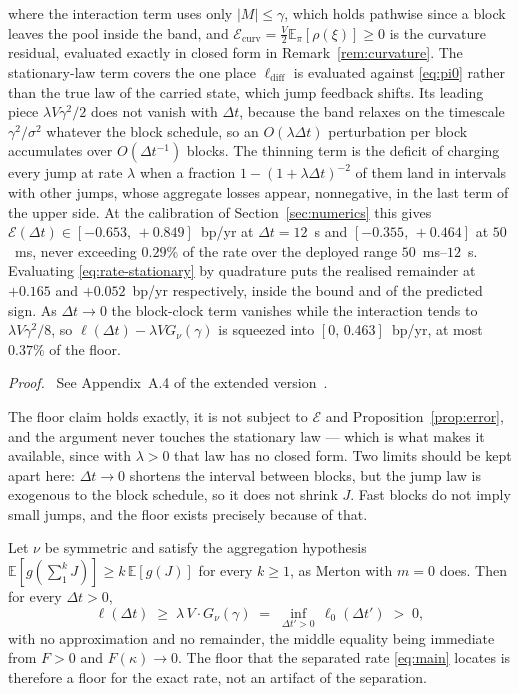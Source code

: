 \documentclass[runningheads]{llncs}
\newcommand{\E}{\mathbb{E}}
\newcommand{\dt}{\Delta t}
\newcommand{\1}{\mathbf{1}}
\newif\ifextended
\newcommand{\deferproof}[1]{%
  \par\smallskip\noindent\textit{Proof.}\ \ifextended
  See Appendix~#1.\else
  See Appendix~#1 of the extended version~\cite{bundi2026ext}.\fi\par\smallskip}
\begin{document}
\begin{proposition}
where the interaction term uses only $|M|\le\gamma$, which holds pathwise since a block leaves the pool inside the band, and $\mathcal{E}_{\mathrm{curv}} = \tfrac{V}{2}\E_\pi[\rho(\xi)] \ge 0$ is the curvature residual, evaluated exactly in closed form in Remark~\ref{rem:curvature}. The stationary-law term covers the one place $\ell_{\mathrm{diff}}$ is evaluated against \eqref{eq:pi0} rather than the true law of the carried state, which jump feedback shifts. Its leading piece $\lambda V\gamma^2/2$ does not vanish with $\dt$, because the band relaxes on the timescale $\gamma^2/\sigma^2$ whatever the block schedule, so an $O(\lambda\dt)$ perturbation per block accumulates over $O(\dt^{-1})$ blocks. The thinning term is the deficit of charging every jump at rate $\lambda$ when a fraction $1-(1+\lambda\dt)^{-2}$ of them land in intervals with other jumps, whose aggregate losses appear, nonnegative, in the last term of the upper side. At the calibration of Section~\ref{sec:numerics} this gives $\mathcal{E}(\dt) \in [-0.653,\,+0.849]$~bp/yr at $\dt=12$~s and $[-0.355,\,+0.464]$ at $50$~ms, never exceeding $0.29\%$ of the rate over the deployed range $50$~ms--$12$~s. Evaluating \eqref{eq:rate-stationary} by quadrature puts the realised remainder at $+0.165$ and $+0.052$~bp/yr respectively, inside the bound and of the predicted sign. As $\dt\to0$ the block-clock term vanishes while the interaction tends to $\lambda V\gamma^2/8$, so $\ell(\dt) - \lambda VG_\nu(\gamma)$ is squeezed into $[0,\,0.463]$~bp/yr, at most $0.37\%$ of the floor.
\end{proposition}

\deferproof{A.4}

The floor claim holds exactly, it is not subject to $\mathcal{E}$ and Proposition~\ref{prop:error}, and the argument never touches the stationary law --- which is what makes it available, since with $\lambda>0$ that law has no closed form. Two limits should be kept apart here: $\dt\to0$ shortens the interval between blocks, but the jump law is exogenous to the block schedule, so it does not shrink $J$. Fast blocks do not imply small jumps, and the floor exists precisely because of that.

\begin{theorem}\label{thm:floor}
Let $\nu$ be symmetric and satisfy the aggregation hypothesis $\E[g(\sum_1^k J)] \ge k\,\E[g(J)]$ for every $k\ge1$, as Merton with $m=0$ does. Then for every $\dt>0$,
\[
\ell(\dt) \;\ge\; \lambda\,V \cdot G_\nu(\gamma) \;=\; \inf_{\dt'>0}\,\ell_0(\dt') \;>\; 0,
\]
with no approximation and no remainder, the middle equality being immediate from $F>0$ and $F(\kappa)\to0$. The floor that the separated rate \eqref{eq:main} locates is therefore a floor for the exact rate, not an artifact of the separation.
\end{theorem}
\end{document}
